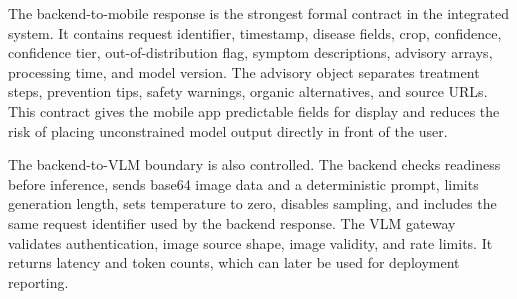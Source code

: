 \begin{table}[H]
\centering
\caption{Integrated subsystem responsibilities}
\label{tab:integrated-subsystem-responsibilities}
\small
{}
\end{table}


The backend-to-mobile response is the strongest formal contract in the integrated system. It
contains request identifier, timestamp, disease fields, crop, confidence, confidence tier,
out-of-distribution flag, symptom descriptions, advisory arrays, processing time, and model
version. The advisory object separates treatment steps, prevention tips, safety warnings, organic
alternatives, and source URLs. This contract gives the mobile app predictable fields for display
and reduces the risk of placing unconstrained model output directly in front of the user.

The backend-to-VLM boundary is also controlled. The backend checks readiness before inference,
sends base64 image data and a deterministic prompt, limits generation length, sets temperature to
zero, disables sampling, and includes the same request identifier used by the backend response.
The VLM gateway validates authentication, image source shape, image validity, and rate limits. It
returns latency and token counts, which can later be used for deployment reporting.

